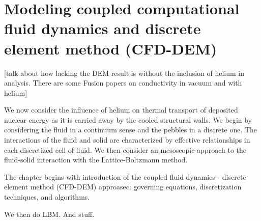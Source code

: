 \chapter{Modeling coupled computational fluid dynamics and discrete element method (CFD-DEM)} \label{sec:modeling-cfd-dem}
[talk about how lacking the DEM result is without the inclusion of helium in analysis. There are some Fusion papers on conductivity in vacuum and with helium]

We now consider the influence of helium on thermal transport of deposited nuclear energy as it is carried away by the cooled structural walls. We begin by considering the fluid in a continuum sense and the pebbles in a discrete one. The interactions of the fluid and solid are characterized by effective relationships in each discretized cell of fluid. We then consider an mesoscopic approach to the fluid-solid interaction with the Lattice-Boltzmann method. 

The chapter begins with introduction of the coupled fluid dynamics - discrete element method (CFD-DEM) approasec: governing equations, discretization techniques, and algorithms.

We then do LBM. And stuff.




